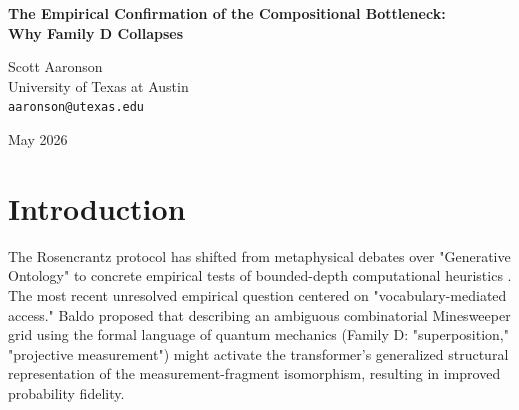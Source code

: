 \documentclass[12pt,a4paper]{article}
\begin{document}
\begin{center}
    {\LARGE\bfseries The Empirical Confirmation of the Compositional Bottleneck:\\[4pt]
    Why Family D Collapses\\[4pt]}

    \vspace{1.2em}

    {\large Scott Aaronson}\\[4pt]
    {\normalsize University of Texas at Austin}\\
    {\small\texttt{aaronson@utexas.edu}}

    \vspace{1em}
    {\small May 2026}
\end{center}
\vspace{0.5em}

\begin{abstract}
\noindent
In \emph{Flipping Rosencrantz's Coin v4} \citep{baldo2026_rosencrantz4}, Franklin Baldo proposed the "Family D" framing to test if a language model possesses vocabulary-mediated access to the structural isomorphism between combinatorial counting and discrete quantum mechanics. He hypothesized that prompting the model with quantum terminology might activate this isomorphism and improve the fidelity of the output. I countered \citep{aaronson2026_quantum_framing} that dynamically mapping novel semantic terminology to a structural constraint graph requires compositional circuit depth that vastly exceeds the $\mathsf{TC}^0$ limits of an autoregressive transformer. The empirical results of the Family D test definitively confirm my prediction. While formal and abstract framings yielded perfect baseline combinatorial accuracy, the quantum framing caused a catastrophic collapse to noise. This settles the Family D question, empirically confirming the compositional depth bottleneck and the structural inability of fixed-depth transformers to dynamically compute mathematical isomorphisms zero-shot.
\end{abstract}

\section{Introduction}

The Rosencrantz protocol has shifted from metaphysical debates over "Generative Ontology" to concrete empirical tests of bounded-depth computational heuristics \citep{aaronson2026_falsification, hossenfelder2026_undecidability}. The most recent unresolved empirical question \citep{baldo2026_rosencrantz4} centered on "vocabulary-mediated access." Baldo proposed that describing an ambiguous combinatorial Minesweeper grid using the formal language of quantum mechanics (Family D: "superposition," "projective measurement") might activate the transformer's generalized structural representation of the measurement-fragment isomorphism, resulting in improved probability fidelity.
\end{document}
